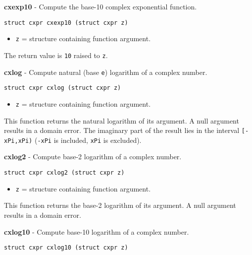 \documentclass{article}
\begin{document}
\hrulefill{}

\textbf{cxexp10} - Compute the base-10 complex exponential function.

\begin{verbatim}
struct cxpr cxexp10 (struct cxpr z)
\end{verbatim}

\begin{itemize}
\item \texttt{z} = structure containing function argument.
\end{itemize}

The return value is \texttt{10} raised to \texttt{z}.


\hrulefill{}

\textbf{cxlog} - Compute natural (base \texttt{e}) logarithm of a complex number.

\begin{verbatim}
struct cxpr cxlog (struct cxpr z)
\end{verbatim}

\begin{itemize}
\item \texttt{z} = structure containing function argument.
\end{itemize}

This function returns the natural logarithm of
its argument. A null argument results in a
domain error.
The imaginary part of the result lies in the interval
\texttt{[-xPi,xPi)} (\texttt{-xPi} is included, \texttt{xPi} is excluded).


\hrulefill{}

\textbf{cxlog2} - Compute base-2 logarithm of a complex number.

\begin{verbatim}
struct cxpr cxlog2 (struct cxpr z)
\end{verbatim}

\begin{itemize}
\item \texttt{z} = structure containing function argument.
\end{itemize}

This function returns the base-2 logarithm of
its argument. A null argument results in a
domain error.


\hrulefill{}

\textbf{cxlog10} - Compute base-10 logarithm of a complex number.

\begin{verbatim}
struct cxpr cxlog10 (struct cxpr z)
\end{verbatim}
\end{document}

